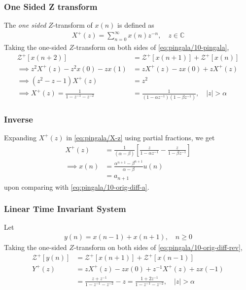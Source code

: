 \documentclass{beamer}
\providecommand{\sbrak}[1]{\ensuremath{{}\left[#1\right]}}
\providecommand{\brak}[1]{\ensuremath{\left(#1\right)}}
\theoremstyle{remark}
\numberwithin{equation}{section}
\begin{document}
\begin{frame}
\frametitle{One Sided Z transform}
The {\em one sided} $Z$-transform of $x(n)$ is defined as 
\begin{align}
	X^{+}(z) = \sum_{n = 0}^{\infty}x(n)z^{-n}, \quad z \in \mathbb{C}
\label{eq:pingala/one-Z}
\end{align}
Taking the one-sided $Z$-transform on both sides of \eqref{eq:pingala/10-pingala},
\begin{align}
	\mathcal{Z}^+\sbrak{x(n + 2)} &= \mathcal{Z}^+\sbrak{x(n + 1)} + \mathcal{Z}^+\sbrak{x(n)} \\
\implies     z^2X^+(z) - z^2x(0) - zx(1) &= zX^+(z) - zx(0) + zX^+(z) \\
 \implies   \brak{z^2 - z - 1}X^+(z) &= z^2 \\
  \implies    X^+(z) = \frac{1}{1 - z^{-1} - z^{-2}} 
    &= \frac{1}{\brak{1 - \alpha z^{-1}}\brak{1 - \beta z^{-1}}}, \quad |z| > \alpha
    \label{eq:pingala/X-z}
\end{align}
\end{frame}
\begin{frame}
	\frametitle{Inverse}
Expanding $X^+(z)$ in \eqref{eq:pingala/X-z} using partial fractions, we get
\begin{align}
    X^+(z) &= \frac{1}{\brak{\alpha - \beta}}\sbrak{\frac{z}{1 - \alpha z^{-1}} - \frac{z}{1 - \beta z^{-1}}} \\
	\implies    x(n) &= \frac{\alpha^{n + 1} - \beta^{n + 1}}{\alpha - \beta}u(n) 
	\\
	&= a_{n + 1}
    \label{eq:pingala/x-n-def}
\end{align}
upon comparing with
	\eqref{eq:pingala/10-orig-diff-a}.
\end{frame}
\begin{frame}
	\frametitle{Linear Time Invariant System}
	Let 
\begin{align}
	y(n) = x\brak{n-1} + x\brak{n+1},  \quad n \ge 0
	\label{eq:pingala/10-orig-diff-rev}
\end{align}
	Taking the one-sided $Z$-transform on both sides of \eqref{eq:pingala/10-orig-diff-rev},
\begin{align}
	\mathcal{Z}^+\sbrak{y(n)} &= \mathcal{Z}^+\sbrak{x(n + 1)} + \mathcal{Z}^+\sbrak{x(n - 1)} \\
	Y^+(z) &= zX^+(z) - zx(0) + z^{-1}X^+(z) + zx(-1) \\
&= \frac{z + z^{-1}}{1 - z^{-1} - z^{-2}} - z 
= \frac{1 + 2z^{-1}}{1 - z^{-1} - z^{-2}}, \quad |z| > \alpha
\end{align}
\end{frame}
\end{document}
